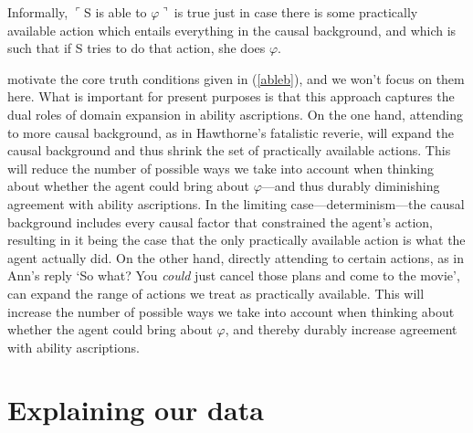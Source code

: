 \documentclass{salt}
\newcommand{\ul}{$\ulcorner$}
\newcommand{\ur}{$\urcorner\ $}
\newcommand{\reff}[1]{(\ref{#1})}
\begin{document}
\noindent Informally, \ul S is able to $\varphi$\ur is true just in case there is some practically available action which entails everything in the causal background, and which is such that if S tries to do that action, she does $\varphi$.

\citet{Mandelkern:2017b} motivate the core truth conditions given in \reff{ableb}, and we won't focus on them here. What is important for present purposes is that this approach captures the dual roles of domain expansion in ability ascriptions. On the one hand, attending to more causal background, as in Hawthorne's fatalistic reverie, will expand the causal background and thus shrink the set of practically available actions. This will reduce the number of possible ways we take into account when thinking about whether the agent could bring about $\varphi$---and thus durably diminishing agreement with ability ascriptions. In the limiting case---determinism---the causal background includes every causal factor that constrained the agent's action, resulting in it being the case that the only practically available action is what the agent actually did. On the other hand, directly attending to certain actions, as in Ann's reply `So what? You \emph{could} just cancel those plans and come to the movie', can {expand} the range of actions we treat as practically available. This will increase the number of possible ways we take into account when thinking about whether the agent could bring about $\varphi$, and thereby durably increase agreement with ability ascriptions.

\section{Explaining our data}

\end{document}
